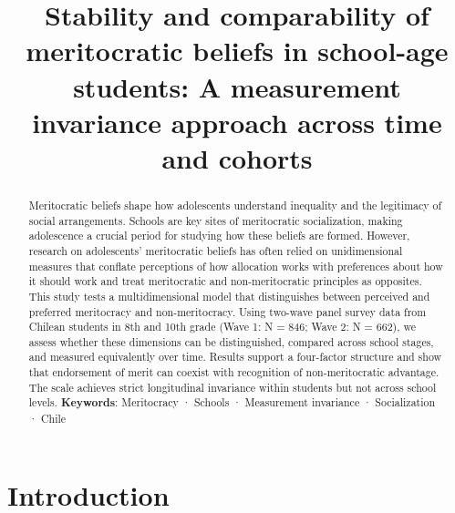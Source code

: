 \documentclass[
  13pt,
]{article}
\title{Stability and comparability of meritocratic beliefs in school-age
students: A measurement invariance approach across time and cohorts}
\date{}
\begin{document}
\maketitle
\begin{abstract}
Meritocratic beliefs shape how adolescents understand inequality and the
legitimacy of social arrangements. Schools are key sites of meritocratic
socialization, making adolescence a crucial period for studying how
these beliefs are formed. However, research on adolescents' meritocratic
beliefs has often relied on unidimensional measures that conflate
perceptions of how allocation works with preferences about how it should
work and treat meritocratic and non-meritocratic principles as
opposites. This study tests a multidimensional model that distinguishes
between perceived and preferred meritocracy and non-meritocracy. Using
two-wave panel survey data from Chilean students in 8th and 10th grade
(Wave 1: N = 846; Wave 2: N = 662), we assess whether these dimensions
can be distinguished, compared across school stages, and measured
equivalently over time. Results support a four-factor structure and show
that endorsement of merit can coexist with recognition of
non-meritocratic advantage. The scale achieves strict longitudinal
invariance within students but not across school levels. \newline
\textbf{Keywords}: Meritocracy · Schools · Measurement invariance ·
Socialization · Chile
\end{abstract}


\section{Introduction}\label{introduction}
\end{document}

